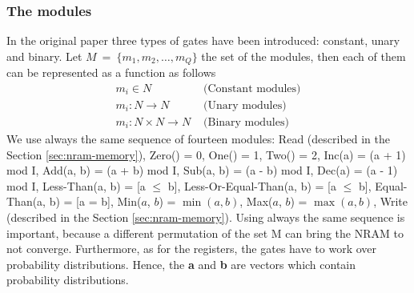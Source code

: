 \subsubsection*{The modules}
In the original paper three types of gates have been introduced: constant, unary and binary. Let $M\ =\ \{m_1, m_2, \dots, m_Q \}$ the set of the modules, then each of them can be represented as a function as follows
\begin{align}
		m_i \in N & \textrm{ (Constant modules)} \\
		m_i: N \rightarrow N & \textrm{ (Unary modules)} \\
		m_i: N \times N \rightarrow N & \textrm{ (Binary modules)}
\end{align}
We use always the same sequence of fourteen modules: Read (described in the Section \ref{sec:nram-memory}), Zero() = 0, One() = 1, Two() = 2, Inc(a) = (a + 1) mod I, Add(a, b) = (a + b) mod I, Sub(a, b) = (a - b) mod I, Dec(a) = (a - 1) mod I, Less-Than(a, b) = [a $\le$ b], Less-Or-Equal-Than(a, b) = [a $\leq$ b], Equal-Than(a, b) = [a = b], Min($a$, $b$) = $\min(a, b)$, Max($a$, $b$) = $\max(a, b)$, Write (described in the Section \ref{sec:nram-memory}). Using always the same sequence is important, because a different permutation of the set M can bring the NRAM to not converge. Furthermore, as for the registers, the gates have to work over probability distributions. Hence, the \textbf{a} and \textbf{b} are vectors which contain probability distributions.

